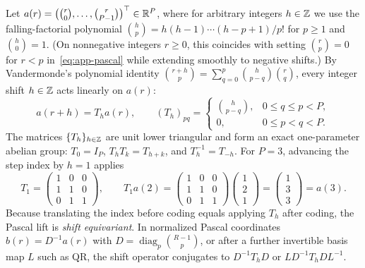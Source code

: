 Let \(a(r) = \bigl(\binom{r}{0}, \ldots, \binom{r}{P-1}\bigr)^\top \in \mathbb{R}^P\),
where for arbitrary integers \(h \in \mathbb{Z}\) we use the falling-factorial polynomial
\(\binom{h}{p} = h(h-1)\cdots(h-p+1)/p!\) for \(p \geq 1\) and \(\binom{h}{0} = 1\).
(On nonnegative integers \(r \geq 0\), this coincides with setting
\(\binom{r}{p} = 0\) for \(r < p\) in~\eqref{eq:app-pascal} while extending
smoothly to negative shifts.) By Vandermonde's polynomial identity
\(\binom{r+h}{p} = \sum_{q=0}^p \binom{h}{p-q}\binom{r}{q}\), every integer shift
\(h \in \mathbb{Z}\) acts linearly on \(a(r)\):
\begin{equation}\label{eq:offset-shift}
 a(r + h) = T_h a(r), \qquad
 (T_h)_{pq} = \begin{cases}
   \binom{h}{p-q}, & 0 \leq q \leq p < P,\\
   0, & 0 \leq p < q < P.
 \end{cases}
\end{equation}
The matrices \(\{T_h\}_{h \in \mathbb{Z}}\) are unit lower triangular and form an exact
one-parameter abelian group: \(T_0 = I_P\), \(T_h T_k = T_{h+k}\), and
\(T_h^{-1} = T_{-h}\). For \(P = 3\), advancing the step index by \(h = 1\)
applies
\[
 T_1 = \begin{pmatrix} 1 & 0 & 0 \\ 1 & 1 & 0 \\ 0 & 1 & 1 \end{pmatrix},
 \qquad
 T_1 a(2) = \begin{pmatrix} 1 & 0 & 0 \\ 1 & 1 & 0 \\ 0 & 1 & 1 \end{pmatrix}
            \begin{pmatrix} 1 \\ 2 \\ 1 \end{pmatrix}
          = \begin{pmatrix} 1 \\ 3 \\ 3 \end{pmatrix} = a(3).
\]
Because translating the index before coding equals applying \(T_h\) after coding,
the Pascal lift is \emph{shift equivariant}. In normalized Pascal coordinates
\(b(r) = D^{-1} a(r)\) with \(D = \operatorname{diag}_p\binom{R-1}{p}\), or after
a further invertible basis map \(L\) such as QR, the shift operator conjugates to
\(D^{-1} T_h D\) or \(L D^{-1} T_h D L^{-1}\).

